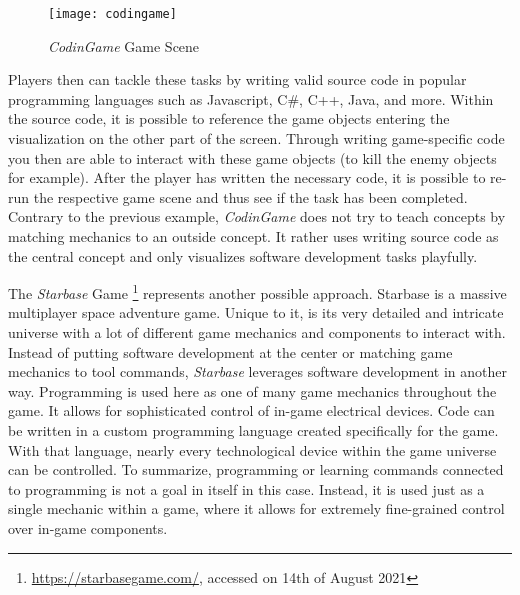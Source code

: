 \begin{figure}[h]
  \centering
  \texttt{[image: codingame]}
  \caption{\textit{CodinGame} Game Scene}
  \label{fig:codingame}
\end{figure}

Players then can tackle these tasks by writing valid source code in popular programming languages such as Javascript, C\#, C++, Java, and more. Within the source code, it is possible to reference the game objects entering the visualization on the other part of the screen. Through writing game-specific code you then are able to interact with these game objects (to kill the enemy objects for example). After the player has written the necessary code, it is possible to re-run the respective game scene and thus see if the task has been completed. Contrary to the previous example, \textit{CodinGame} does not try to teach concepts by matching mechanics to an outside concept. It rather uses writing source code as the central concept and only visualizes software development tasks playfully.

The \textit{Starbase} Game \footnote{\url{https://starbasegame.com/}, accessed on 14th of August 2021} represents another possible approach. Starbase is a massive multiplayer space adventure game. Unique to it, is its very detailed and intricate universe with a lot of different game mechanics and components to interact with. Instead of putting software development at the center or matching game mechanics to tool commands, \textit{Starbase} leverages software development in another way. Programming is used here as one of many game mechanics throughout the game. It allows for sophisticated control of in-game electrical devices. Code can be written in a custom programming language created specifically for the game. With that language, nearly every technological device within the game universe can be controlled. To summarize, programming or learning commands connected to programming is not a goal in itself in this case. Instead, it is used just as a single mechanic within a game, where it allows for extremely fine-grained control over in-game components.

